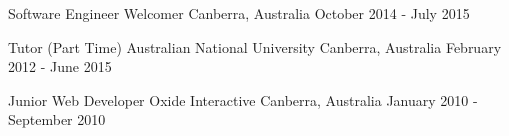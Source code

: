 \begin{cventries}


\cventry
{Software Engineer} %
{Welcomer} %
{Canberra, Australia} %
{October 2014 - July 2015} %
{ %
\begin{cvitems}
\end{cvitems}
}
{}

\vspace{-7.5mm}


\cventry
{Tutor (Part Time)} %
{Australian National University} %
{Canberra, Australia} %
{February 2012 - June 2015} %
{ %
\begin{cvitems}
\end{cvitems}
}
{}

\vspace{-7.5mm}


\cventry
{Junior Web Developer} %
{Oxide Interactive} %
{Canberra, Australia} %
{January 2010 - September 2010} %
{ %
\begin{cvitems}
\end{cvitems}
}
{}


\end{cventries}
